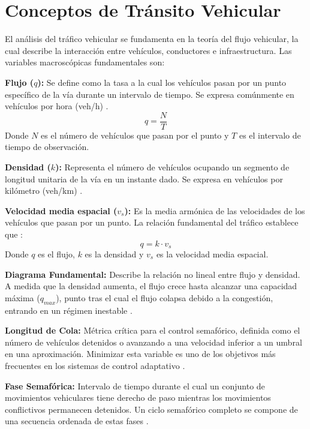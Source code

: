 \section{Conceptos de Tránsito Vehicular}
El análisis del tráfico vehicular se fundamenta en la teoría del flujo vehicular, la cual describe la interacción entre vehículos, conductores e infraestructura. Las variables macroscópicas fundamentales son:

\textbf{Flujo ($q$):} Se define como la tasa a la cual los vehículos pasan por un punto específico de la vía durante un intervalo de tiempo. Se expresa comúnmente en vehículos por hora (veh/h) \cite{survey_prajapati2024,survey_haydari2022}.
\begin{equation}
    q = \frac{N}{T}
\end{equation}
Donde $N$ es el número de vehículos que pasan por el punto y $T$ es el intervalo de tiempo de observación.

\textbf{Densidad ($k$):} Representa el número de vehículos ocupando un segmento de longitud unitaria de la vía en un instante dado. Se expresa en vehículos por kilómetro (veh/km) \cite{survey_haydari2022}.

\textbf{Velocidad media espacial ($v_s$):} Es la media armónica de las velocidades de los vehículos que pasan por un punto. La relación fundamental del tráfico establece que \cite{survey_prajapati2024}:
\begin{equation}
    q = k \cdot v_s
\end{equation}
Donde $q$ es el flujo, $k$ es la densidad y $v_s$ es la velocidad media espacial.

\textbf{Diagrama Fundamental:} Describe la relación no lineal entre flujo y densidad. A medida que la densidad aumenta, el flujo crece hasta alcanzar una capacidad máxima ($q_{max}$), punto tras el cual el flujo colapsa debido a la congestión, entrando en un régimen inestable \cite{survey_haydari2022,review_noaeen2022}.

\textbf{Longitud de Cola:} Métrica crítica para el control semafórico, definida como el número de vehículos detenidos o avanzando a una velocidad inferior a un umbral en una aproximación. Minimizar esta variable es uno de los objetivos más frecuentes en los sistemas de control adaptativo \cite{review_rasheed2020,review_noaeen2022}.

\textbf{Fase Semafórica:} Intervalo de tiempo durante el cual un conjunto de movimientos vehiculares tiene derecho de paso mientras los movimientos conflictivos permanecen detenidos. Un ciclo semafórico completo se compone de una secuencia ordenada de estas fases \cite{survey_haydari2022}.

